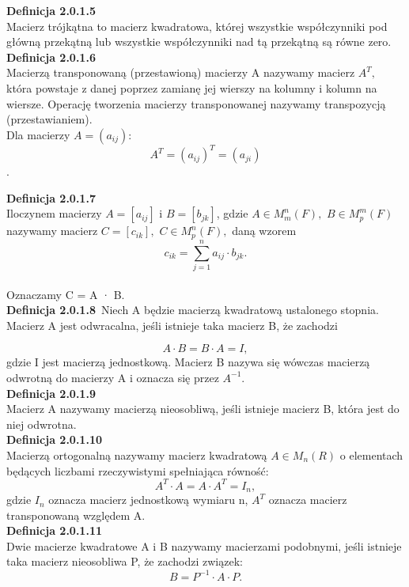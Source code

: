 \documentclass[10pt,a4paper]{report}
\newcommand{\transpose}[1]{{#1}^T}
\begin{document}
\noindent \textbf{Definicja 2.0.1.5}\\
\noindent Macierz trójkątna to macierz kwadratowa, której wszystkie współczynniki pod główną przekątną lub wszystkie współczynniki nad tą przekątną są równe zero.\\

\noindent \textbf{Definicja 2.0.1.6}\\
\noindent Macierzą transponowaną (przestawioną) macierzy A nazywamy macierz $A^{T},$ która powstaje z danej poprzez zamianę jej wierszy na kolumny i kolumn na wiersze. Operację tworzenia macierzy transponowanej nazywamy transpozycją (przestawianiem).\\
Dla macierzy $A=(a_{ij}):$ 
$$ 
\transpose{A} = \transpose{(a_{ij})}=(a_{ji})
$$.

\noindent \textbf{Definicja 2.0.1.7}\\
\noindent Iloczynem macierzy $A = [a_{ij} ]$ i $B = [b_{jk}]$, gdzie $A\in M_{m}^{n}(F), $ $B\in M_{p}^{m}(F)$ nazywamy macierz $C = [c_{ik}], $ $C \in M_{p}^{n}(F), $ daną wzorem $$ c_{ik} = \sum_{j=1}^{n} a_{ij}\cdot b_{jk}. $$\\
Oznaczamy C = A · B.\\

\noindent \textbf{Definicja 2.0.1.8}\
\noindent Niech A będzie macierzą kwadratową ustalonego stopnia. Macierz A jest odwracalna, jeśli istnieje taka macierz B, że zachodzi

 $$A\cdot B=B\cdot A=I, $$ gdzie I jest macierzą jednostkową. Macierz B nazywa się wówczas macierzą odwrotną do macierzy A i oznacza się przez  $A^{-1}.$\\

\noindent \textbf{Definicja 2.0.1.9}\\
\noindent Macierz A nazywamy macierzą nieosobliwą, jeśli istnieje macierz B, która jest do niej odwrotna.\\  

\noindent \textbf{Definicja 2.0.1.10}\\
\noindent Macierzą ortogonalną nazywamy macierz kwadratową $A\in M_{n}(R)$ o elementach będących liczbami rzeczywistymi spełniająca równość:
$$A^{T}\cdot A=A\cdot A^{T}=I_{n},$$ gdzie $I_{n}$ oznacza macierz jednostkową wymiaru n, $A^{T}$ oznacza macierz transponowaną względem A.\\

\noindent \textbf{Definicja 2.0.1.11}\\
\noindent Dwie macierze kwadratowe A i B nazywamy macierzami podobnymi, jeśli istnieje taka macierz nieosobliwa P, że zachodzi związek: $$ B=P^{-1}\cdot A\cdot P. $$
\end{document}
